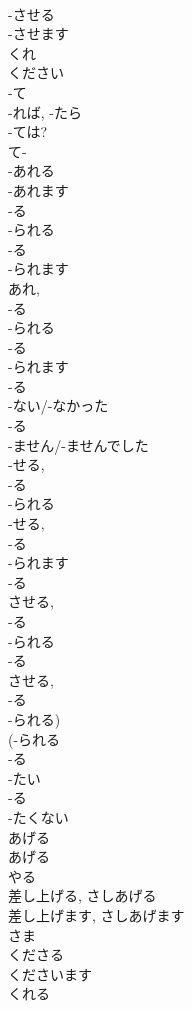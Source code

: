 \documentclass[8pt]{extreport}
\begin{document}
\begin{CJK}{UTF8}{min}
\\	-させる 
\\	-させます 
\\	くれ 
\\	ください 
\\	-て 
\\	-れば, -たら 
\\	-ては?
\\	て-
\\	-あれる
\\	-あれます
\\	-る 
\\	-られる
\\	-る 
\\	-られます
\\	あれ, 
\\	-る 
\\	-られる
\\	-る 
\\	-られます
\\	-る 
\\	-ない/-なかった
\\	-る 
\\	-ません/-ませんでした
\\	-せる, 
\\	-る 
\\	-られる
\\	-せる, 
\\	-る 
\\	-られます
\\	-る 
\\	させる, 
\\	-る 
\\	-られる
\\	-る 
\\	させる, 
\\	-る 
\\	-られる)
\\	(-られる 
\\	-る 
\\	-たい	
\\	-る 
\\	-たくない	
\\	あげる	
\\	あげる	
\\	やる	
\\	差し上げる, さしあげる
\\	差し上げます, さしあげます
\\	さま 
\\	くださる
\\	くださいます
\\	くれる

\end{CJK}
\end{document}
